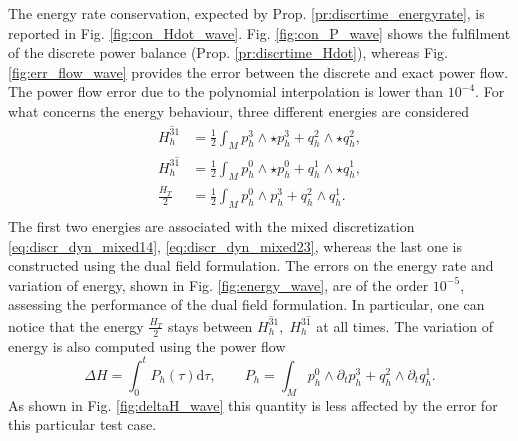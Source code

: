 \documentclass{elsarticle}
\renewcommand\d{\ensuremath{\mathrm{d}}}
\begin{document}
The energy rate conservation, expected by Prop. \ref{pr:discrtime_energyrate}, is reported in Fig. \ref{fig:con_Hdot_wave}. Fig. \ref{fig:con_P_wave} shows the fulfilment of the discrete power balance (Prop. \ref{pr:discrtime_Hdot}), whereas Fig. \ref{fig:err_flow_wave} provides the error between the discrete and exact power flow. The power flow error due to the polynomial interpolation is lower than $10^{-4}$. 
For what concerns the energy behaviour, three different energies are considered
\begin{equation*}
\begin{aligned}
    H^{\widehat{3}1}_h&= \frac{1}{2} \int_M p^3_h \wedge \star p^3_h + q^2_h \wedge \star q_h^2, \\
    H^{3\widehat{1}}_h&= \frac{1}{2} \int_M p^0_h \wedge \star p^0_h + q^1_h \wedge \star q_h^1, \\
    \frac{H_T}{2} &= \frac{1}{2} \int_M p^0_h \wedge p^3_h + q^2_h \wedge q_h^1. \\
\end{aligned}
\end{equation*}
The first two energies are associated with the mixed discretization \eqref{eq:discr_dyn_mixed14}, \eqref{eq:discr_dyn_mixed23}, whereas the last one is constructed using the dual field formulation. The errors on the energy rate and variation of energy, shown in Fig. \ref{fig:energy_wave}, are of the order $10^{-5}$, assessing the performance of the dual field formulation. In particular, one can notice that the energy $\frac{H_T}{2}$ stays between $H^{\widehat{3}1}_h, \; H^{3\widehat{1}}_h$ at all times. The variation of energy is also computed using the power flow 
\begin{equation*}
    \Delta H = \int_0^t P_h(\tau) \d\tau, \qquad P_h = \int_M p^0_h \wedge \partial_t p^3_h + q^2_h \wedge \partial_t q_h^1.
\end{equation*}
As shown in Fig. \ref{fig:deltaH_wave} this quantity is less affected by the error for this particular test case. 
\end{document}
